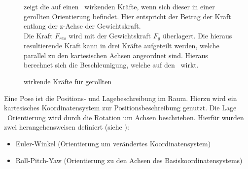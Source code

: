 \begin{figure}[ht!]
\vspace{0.25cm}
\begin{center}
\caption{wirkende Kräfte für gerollten \Quad\ }
\label{fig:ForcesRolled}
\end{center}

\vspace{0.25cm}
 zeigt die auf einen \Quad\ wirkenden Kräfte, wenn sich dieser in einer gerollten Orientierung befindet. Hier entspricht der Betrag der Kraft entlang der z-Achse der Gewichtskraft.\\
Die Kraft $F_{res}$ wird mit der Gewichtskraft $F_g$ überlagert. Die hieraus resultierende Kraft kann in drei Kräfte aufgeteilt werden, welche parallel zu den kartesischen Achsen angeordnet sind. Hieraus berechnet sich die Beschleunigung, welche auf den \Quad\ wirkt.
\end{figure}




Eine Pose ist die Positions- und Lagebeschreibung im Raum. Hierzu wird ein kartesisches Koordinatensystem zur Positionsbeschreibung genutzt. Die Lage \bzw\ Orientierung wird durch die Rotation um Achsen beschrieben. Hierfür wurden zwei herangehensweisen definiert (siehe \cite{VLRobo1-5}):
\begin{itemize}
\item Euler-Winkel (Orientierung um verändertes Koordinatensystem)
\item Roll-Pitch-Yaw (Orientierung zu den Achsen des Basiskoordinatensystems)
\end{itemize}

